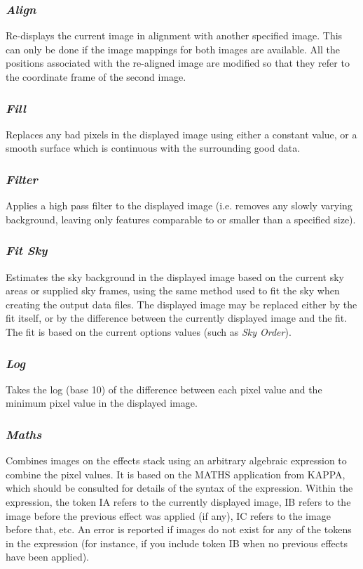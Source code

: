\documentclass[11pt]{article}
\newcommand{\htmlref}[2]{#1}
\newcommand{\xref}[3]{#1}
\newcommand{\xlabel}[1]{}
\newcommand{\mylabel}[1] {\xlabel{#1}\label{#1}}
\begin{document}
\subsubsection {\mylabel{POLKA_ALIGN_EFFECT}\emph{Align} }
Re-displays the current image in alignment with another specified image.
This can only be done if the image mappings for both images are
available. All the positions associated with the re-aligned image are
modified so that they refer to the coordinate frame of the second image.

\subsubsection {\mylabel{POLKA_FILL_EFFECT}\emph{Fill} }
Replaces any bad pixels in the displayed image using either a constant
value, or a smooth surface which is continuous with the surrounding good
data.

\subsubsection {\mylabel{POLKA_FILTER_EFFECT}\emph{Filter} }
Applies a high pass filter to the displayed image (i.e. removes any
slowly varying background, leaving only features comparable to or smaller
than a specified size).

\subsubsection {\mylabel{POLKA_FITSKY_EFFECT}\emph{Fit Sky} }
Estimates the sky background in the displayed image based on the current
sky areas or supplied sky frames, using the same method used to fit the
sky when creating the output data files. The displayed image may be
replaced either by the fit itself, or by the difference between the
currently displayed image and the fit. The fit is based on the current
options values (such as \htmlref{\emph{Sky Order}}{POLKA_SKYORDER}).

\subsubsection {\mylabel{POLKA_LOG_EFFECT}\emph{Log} }
Takes the log (base 10) of the difference between each pixel value and the
minimum pixel value in the displayed image.

\subsubsection {\mylabel{POLKA_MATHS_EFFECT}\emph{Maths} }
Combines images on the effects stack using an arbitrary algebraic expression
to combine the pixel values. It is based on the \xref{MATHS}{sun95}{MATHS}
application from \xref{KAPPA}{sun95}{}, which should be consulted for
details of the syntax of the expression. Within the expression, the token IA
refers to the currently displayed image, IB refers to the image before
the previous effect was applied (if any), IC refers to the image before
that, etc. An error is reported if images do not exist for any of the
tokens in the expression (for instance, if you include token IB when no
previous effects have been applied).
\end{document}
